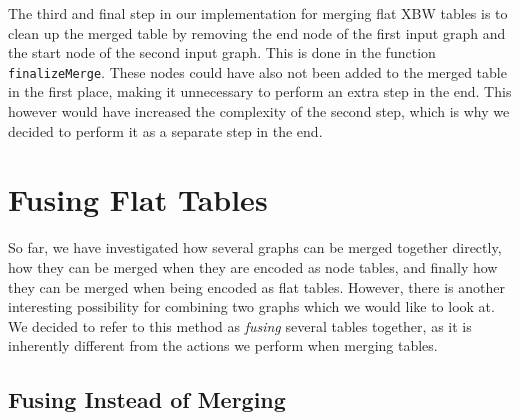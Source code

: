 \documentclass[a4paper,12pt,twoside,BCOR=10mm]{scrbook}
\begin{document}
The third and final step in our implementation for merging flat XBW tables
is to clean up the merged table by removing the end node of the first input graph
and the start node of the second input graph.
This is done in the function \texttt{finalizeMerge}.
These nodes could have also not been added to the merged table in the first place,
making it unnecessary to perform an extra step in the end.
This however would have increased the complexity of the second step, which is why we
decided to perform it as a separate step in the end.


\section{Fusing Flat Tables}
\label{sec:fusing_flat_tables}
%

So far, we have investigated how several graphs can be merged together directly,
how they can be merged when they are encoded as node tables,
and finally how they can be merged when being encoded as flat tables.
However, there is another interesting possibility for
combining two graphs which we would like to look at.
We decided to refer to this method as \textit{fusing} several tables together,
as it is inherently different from the actions we perform when merging tables.

\subsection{Fusing Instead of Merging}
\end{document}
